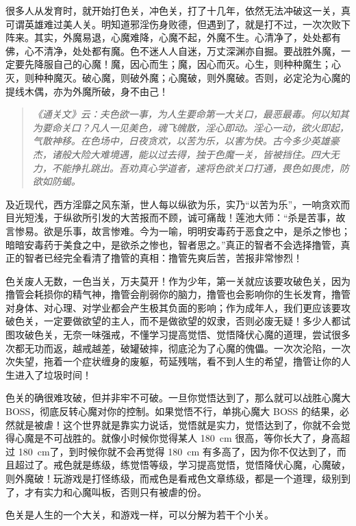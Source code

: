 很多人从发育时，就开始打色关，冲色关，打了十几年，依然无法冲破这一关，真可谓英雄难过美人关。明知道邪淫伤身败德，但遇到了，就是打不过，一次次败下阵来。其实，外魔易退，心魔难降，心魔不起，外魔不生。心清净了，处处都有佛，心不清净，处处都有魔。色不迷人人自迷，万丈深渊亦自掘。要战胜外魔，一定要先降服自己的心魔！魔，因心而生；魔，因心而灭。心生，则种种魔生；心灭，则种种魔灭。破心魔，则破外魔；心魔破，则外魔破。否则，必定沦为心魔的提线木偶，亦为外魔所破，身不由己！

\begin{quote}\it
    《通关文》云：夫色欲一事，为人生要命第一大关口，最恶最毒。何以知其为要命关口？凡人一见美色，魂飞魄散，淫心即动。淫心一动，欲火即起，气散神移。在色场中，日夜贪欢，以苦为乐，以害为快。古今多少英雄豪杰，诸般大险大难境遇，能以过去得，独于色魔一关，皆被挡住。四大无力，不能挣扎跳出。吾劝真心学道者，速将色欲关口打通，畏色如畏虎，防欲如防蝎。
\end{quote}

及近现代，西方淫靡之风东渐，世人每以纵欲为乐，实乃“以苦为乐”，一响贪欢而目光短浅，于纵欲所引发的大苦报而不顾，诚可痛哉！莲池大师：“杀是苦事，故言惨易。欲是乐事，故言惨难。今为一喻，明明安毒药于恶食之中，是杀之惨也；暗暗安毒药于美食之中，是欲杀之惨也，智者思之。”真正的智者不会选择撸管，真正的智者已经完全看清了撸管的真相：撸管先爽后苦，苦报非常惨烈！

色关废人无数，一色当关，万夫莫开！作为少年，第一关就应该要攻破色关，因为撸管会耗损你的精气神，撸管会削弱你的脑力，撸管也会影响你的生长发育，撸管对身体、对心理、对学业都会产生极其负面的影响；作为成年人，我们更应该要攻破色关，一定要做欲望的主人，而不是做欲望的奴隶，否则必废无疑！多少人都试图攻破色关，无奈一味强戒，不懂学习提高觉悟、觉悟降伏心魔的道理，尝试很多次都无功而返，越戒越差，破罐破摔，彻底沦为了心魔的傀儡。一次次沦陷，一次次失望，拖着一个症状缠身的废躯，苟延残喘，看不到人生的希望，撸管让你的人生进入了垃圾时间！

色关的确很难攻破，但并非牢不可破。一旦你觉悟达到了，那么就可以战胜心魔大 BOSS，彻底反转心魔对你的控制。如果觉悟不行，单挑心魔大 BOSS 的结果，必然就是被虐！这个世界就是靠实力说话，觉悟就是实力，觉悟达到了，你就不会觉得心魔是不可战胜的。就像小时候你觉得某人 \SI{180}{\centi\metre} 很高，等你长大了，身高超过 \SI{180}{\centi\metre}了，到时候你就不会再觉得 \SI{180}{\centi\metre} 有多高了，因为你不仅达到了，而且超过了。戒色就是练级，练觉悟等级，学习提高觉悟，觉悟降伏心魔，心魔破，则外魔破！玩游戏是打怪练级，而戒色是看戒色文章练级，都是一个道理，级别到了，才有实力和心魔叫板，否则只有被虐的份。

色关是人生的一个大关，和游戏一样，可以分解为若干个小关。

